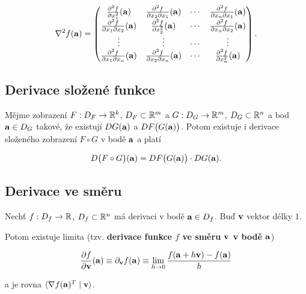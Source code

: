 \[ \nabla^2 f(\mathbf{a}) = \begin{pmatrix}
        \frac{\partial^2 f}{\partial x_1^2}(\mathbf{a}) & \frac{\partial^2 f}{\partial x_2 \partial x_1}(\mathbf{a}) & \cdots & \frac{\partial^2 f}{\partial x_n \partial x_1}(\mathbf{a}) \\ \frac{\partial^2 f}{\partial x_1 \partial x_2}(\mathbf{a}) & \frac{\partial^2 f}{\partial x_2^2}(\mathbf{a}) & \cdots & \frac{\partial^2 f}{\partial x_n \partial x_2}(\mathbf{a}) \\ \vdots & \vdots & \cdots & \vdots \\ \frac{\partial^2 f}{\partial x_1 \partial x_n}(\mathbf{a}) & \frac{\partial^2 f}{\partial x_2 \partial x_n}(\mathbf{a}) & \cdots & \frac{\partial^2 f}{\partial x_n^2}(\mathbf{a})
    \end{pmatrix}. \]

\subsection*{Derivace složené funkce}

Mějme zobrazení $F: D_F \to \mathbb{R}^k$, $D_F \subset \mathbb{R}^m$ a $G: D_G \to \mathbb{R}^m$, $D_G
    \subset \mathbb{R}^n$ a bod $\mathbf{a} \in D_G$ takové, že existují $DG(\mathbf{a})$ a $D F\big(
    G(\mathbf{a}) \big)$. Potom existuje i derivace složeného zobrazení $F \circ G$ v bodě
$\mathbf{a}$ a platí

\[ D\big( F \circ G \big)(\mathbf{a}) = DF\big(G(\mathbf{a})\big) \cdot DG(\mathbf{a}). \]

\subsection*{Derivace ve směru}

Nechť $f: D_f \to \mathbb{R}$, $D_f \subset \mathbb{R}^n$ má derivaci v bodě $\mathbf{a} \in D_f$. Buď
$\mathbf{v}$ vektor délky $1$.

\noindent Potom existuje limita (tzv. \textbf{derivace funkce $f$ ve směru $\mathbf{v}$ v bodě $\mathbf{a}$})

\[ \frac{\partial f}{\partial \mathbf{v}}(\mathbf{a}) \equiv \partial_{\mathbf{v}} f(\mathbf{a}) \equiv \lim_{h \to 0} \frac{f(\mathbf{a} + h\mathbf{v}) - f(\mathbf{a})}{h} \]

\noindent a je rovna $\langle \nabla f(\mathbf{a})^T \mid \mathbf{v} \rangle$.

\pagebreak